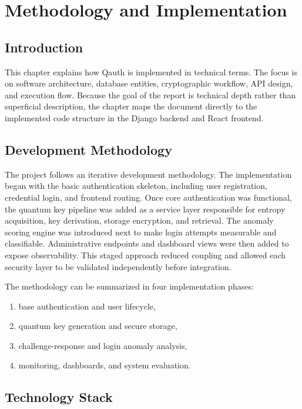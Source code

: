 \chapter{Methodology and Implementation}

\section{Introduction}
This chapter explains how Qauth is implemented in technical terms. The focus is on software architecture, database entities, cryptographic workflow, API design, and execution flow. Because the goal of the report is technical depth rather than superficial description, the chapter maps the document directly to the implemented code structure in the Django backend and React frontend.

\section{Development Methodology}
The project follows an iterative development methodology. The implementation began with the basic authentication skeleton, including user registration, credential login, and frontend routing. Once core authentication was functional, the quantum key pipeline was added as a service layer responsible for entropy acquisition, key derivation, storage encryption, and retrieval. The anomaly scoring engine was introduced next to make login attempts measurable and classifiable. Administrative endpoints and dashboard views were then added to expose observability. This staged approach reduced coupling and allowed each security layer to be validated independently before integration.

The methodology can be summarized in four implementation phases:

\begin{enumerate}
    \item base authentication and user lifecycle,
    \item quantum key generation and secure storage,
    \item challenge-response and login anomaly analysis,
    \item monitoring, dashboards, and system evaluation.
\end{enumerate}

\section{Technology Stack}

